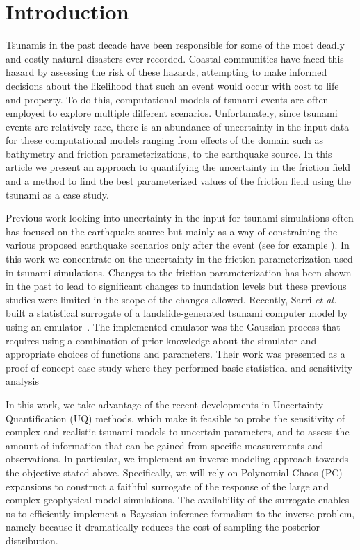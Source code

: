
\section{Introduction}

Tsunamis in the past decade have been responsible for some of the most deadly and costly natural disasters ever recorded.  Coastal communities have faced this hazard by assessing the risk of these hazards, attempting to make informed decisions about the likelihood that such an event would occur with cost to life and property.  To do this, computational models of tsunami events are often employed to explore multiple different scenarios.  Unfortunately, since tsunami events are relatively rare, there is an abundance of uncertainty in the input data for these computational models ranging from effects of the domain such as bathymetry and friction parameterizations, to the earthquake source.  In this article we present an approach to quantifying the uncertainty in the friction field and a method to find the best parameterized values of the friction field using the \tohoku tsunami as a case study.

Previous work looking into uncertainty in the input for tsunami simulations often has focused on the earthquake source but mainly as a way of constraining the various proposed earthquake scenarios only after the event (see for example \cite{MacInnes:2013cr}).  In this work we concentrate on the uncertainty in the friction parameterization used in tsunami simulations.  Changes to the friction parameterization has been shown in the past to lead to significant changes to inundation levels \cite{Myers:2001el,Jakeman:2010hk} but these previous studies were limited in the scope of the changes allowed.  Recently, Sarri \emph{et al.} built a statistical surrogate of a landslide-generated tsunami computer model by using an emulator~\cite{Sarri2012}. The implemented emulator was the Gaussian process
that requires using a combination of prior knowledge about the simulator and
appropriate choices of functions and parameters. Their work was presented as a proof-of-concept case study
where they performed basic statistical and sensitivity analysis 

In this work, we take advantage of the recent developments in Uncertainty Quantification 
(UQ) methods, which make it feasible to probe the sensitivity of complex and realistic tsunami models 
to uncertain parameters, and to assess the amount of information that can
be gained from specific measurements and observations. In particular, 
we implement an inverse modeling approach towards the objective stated above.  
Specifically, we will rely on Polynomial Chaos (PC) expansions to construct a 
faithful surrogate of the response of the large and complex geophysical 
model simulations.  The availability of the surrogate enables us to efficiently 
implement a Bayesian inference formalism to the inverse problem, namely 
because it dramatically reduces the cost of sampling the posterior distribution. 

